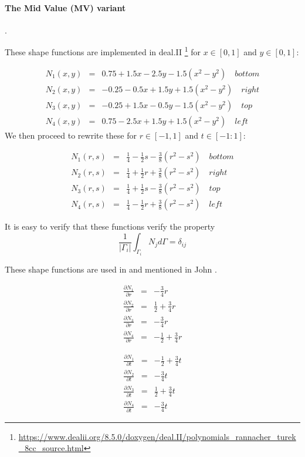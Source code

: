 \paragraph{The Mid Value (MV) variant}. 

These shape functions are implemented in deal.II
\footnote{\url{https://www.dealii.org/8.5.0/doxygen/deal.II/polynomials_rannacher_turek_8cc_source.html}}
for $x\in[0,1]$ and $y\in[0,1]$:

\begin{eqnarray}
N_1(x,y) &=&  0.75 + 1.5x - 2.5y -1.5(x^2-y^2) \quad bottom\\
N_2(x,y) &=& -0.25 - 0.5x + 1.5y +1.5(x^2-y^2) \quad right\\
N_3(x,y) &=& -0.25 + 1.5x - 0.5y -1.5(x^2-y^2) \quad top\\
N_4(x,y) &=&  0.75 - 2.5x + 1.5y +1.5(x^2-y^2) \quad left
\end{eqnarray}
We then proceed to rewrite these for $r\in[-1,1]$ and $t\in[-1:1]$:
\begin{mdframed}[backgroundcolor=blue!5]
\begin{eqnarray}
N_1(r,s) &=& \frac{1}{4} -\frac{1}{2}s - \frac{3}{8}(r^2-s^2) \quad bottom \\
N_2(r,s) &=& \frac{1}{4} +\frac{1}{2}r + \frac{3}{8}(r^2-s^2) \quad right \\
N_3(r,s) &=& \frac{1}{4} +\frac{1}{2}s - \frac{3}{8}(r^2-s^2) \quad top \\
N_4(r,s) &=& \frac{1}{4} -\frac{1}{2}r + \frac{3}{8}(r^2-s^2) \quad left
\end{eqnarray}
\end{mdframed}
It is easy to verify that these functions verify the property
\[
\frac{1}{|\Gamma_i|} \int_{\Gamma_i} N_j d\Gamma = \delta_{ij}
\]

These shape functions are used in \cite{shzh06} and mentioned in John \cite[p.722]{john16}.

\begin{eqnarray}
\frac{\partial N_1}{\partial r} &=& -\frac{3}{4}r \nonumber\\
\frac{\partial N_2}{\partial r} &=& \frac{1}{2}+\frac{3}{4}r \nonumber\\
\frac{\partial N_3}{\partial r} &=& -\frac{3}{4}r \nonumber\\
\frac{\partial N_4}{\partial r} &=& -\frac{1}{2}+\frac{3}{4}r \nonumber
\end{eqnarray}

\begin{eqnarray}
\frac{\partial N_1}{\partial t} &=& -\frac{1}{2}+\frac{3}{4}t \nonumber\\
\frac{\partial N_2}{\partial t} &=& -\frac{3}{4}t \nonumber\\
\frac{\partial N_3}{\partial t} &=& \frac{1}{2}+\frac{3}{4}t \nonumber\\
\frac{\partial N_4}{\partial t} &=& -\frac{3}{4}t \nonumber
\end{eqnarray}



